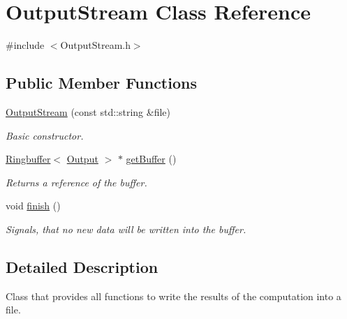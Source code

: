 \hypertarget{classOutputStream}{\section{Output\-Stream Class Reference}
\label{classOutputStream}
}


{\ttfamily \#include $<$Output\-Stream.\-h$>$}

\subsection*{Public Member Functions}
\begin{DoxyCompactItemize}
\item 
\hyperlink{classOutputStream_ab97193a7507f0c869503c94d823d24e7}{Output\-Stream} (const std\-::string \&file)
\begin{DoxyCompactList}\small\item\em Basic constructor. \end{DoxyCompactList}\item 
\hypertarget{classOutputStream_a0e0bc9c5542c5e56e7b331e19c31890d}{\hyperlink{classRingbuffer}{Ringbuffer}$<$ \hyperlink{structfitData}{Output} $>$ $\ast$ \hyperlink{classOutputStream_a0e0bc9c5542c5e56e7b331e19c31890d}{get\-Buffer} ()}\label{classOutputStream_a0e0bc9c5542c5e56e7b331e19c31890d}

\begin{DoxyCompactList}\small\item\em Returns a reference of the buffer. \end{DoxyCompactList}\item 
void \hyperlink{classOutputStream_a745f5ac06041a45658853aef664de0fd}{finish} ()
\begin{DoxyCompactList}\small\item\em Signals, that no new data will be written into the buffer. \end{DoxyCompactList}\end{DoxyCompactItemize}


\subsection{Detailed Description}
Class that provides all functions to write the results of the computation into a file. 

